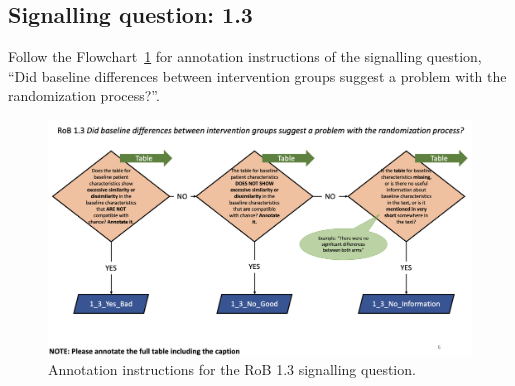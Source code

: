 \documentclass[sn-mathphys,Numbered]{sn-jnl}%
\begin{document}
\subsection*{Signalling question: 1.3}
%
Follow the Flowchart~\ref{fig:1_3} for annotation instructions of the signalling question, ``Did baseline differences between intervention groups suggest a problem with the randomization process?''.
%

\begin{figure}[hbt]
    \centering
    \includegraphics[width=\textwidth]{figures/1_3.png}
    \caption{Annotation instructions for the RoB 1.3 signalling question.}
    \label{fig:1_3}
\end{figure}

%
\end{document}
